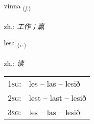 \documentclass[frontgrid, backgrid]{flacards}\usepackage[]{graphicx}\usepackage[]{xcolor}
\begin{document}
\renewcommand{\flhead}{\vskip5pt \fboxsep=0pt {\small\bfseries\footnotesize Nafnorð | 名词}}
\renewcommand{\fcfoot}{\vskip5pt \fboxsep=0pt \hspace{2pt}{\small\bfseries\footnotesize 1K}}

\renewcommand{\blhead}{\vskip5pt {\small\bfseries\footnotesize Nafnorð | 名词 }}
\renewcommand{\bcfoot}{\vskip5pt \hspace{2pt}{\small\bfseries\footnotesize 1K}}


{vinna \small{\textsubscript{(\textit{f.})}} \\[1ex] %
\textphonetic{[vɪna]} \\
zh.: \emph{工作；赢} \\  [2ex]
\renewcommand*{\arraystretch}{0.8}
}

\renewcommand{\flhead}{\vskip5pt \fboxsep=0pt {\small\bfseries\footnotesize Sagnorð | 动词}}
\renewcommand{\fcfoot}{\vskip5pt \fboxsep=0pt \hspace{2pt}{\small\bfseries\footnotesize 1K}}

\renewcommand{\blhead}{\vskip5pt {\small\bfseries\footnotesize Sagnorð | 动词 }}
\renewcommand{\bcfoot}{\vskip5pt \hspace{2pt}{\small\bfseries\footnotesize 1K}}


{lesa \small{\textsubscript{(\textit{v.})}} \\[1ex] %
\textphonetic{[lɛːsa]} \\
zh.: \emph{读} \\  [2ex]
\renewcommand*{\arraystretch}{0.8}
\begin{tabular}{p{1cm}l}
\textsc{1sg}: & les -- las -- lesið \\ 
\textsc{2sg}: & lest -- last -- lesið \\ 
\textsc{3sg}: & les -- las -- lesið \\ 
\end{tabular}
}
\end{document}
